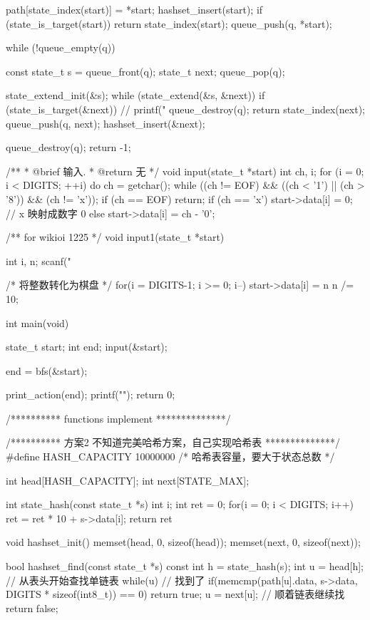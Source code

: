 \begin{Codex}[label=eight_digits_bfs2.c]
{    path[state_index(start)] = *start;
    hashset_insert(start);
    if (state_is_target(start))
        return state_index(start);
    queue_push(q, *start);

    while (!queue_empty(q)) {
        const state_t s = queue_front(q);
        state_t next;
        queue_pop(q);

        state_extend_init(&s);
        while (state_extend(&s, &next)) {
            if (state_is_target(&next)) {
                // printf("%
                queue_destroy(q);
                return state_index(next);
            }
            queue_push(q, next);
            hashset_insert(&next);
        }
    }
    queue_destroy(q);
    return -1;
}

/**
 * @brief 输入.
 * @return 无
 */
void input(state_t *start) {
    int ch, i;
    for (i = 0; i < DIGITS; ++i) {
        do {
            ch = getchar();
        } while ((ch != EOF) && ((ch < '1') || (ch > '8')) && (ch != 'x'));
        if (ch == EOF) return;
        if (ch == 'x') start->data[i] = 0; // x 映射成数字 0
        else           start->data[i] = ch - '0';
    }
}

/** for wikioi 1225 */
void input1(state_t *start) {
    int i, n;
    scanf("%

    /* 将整数转化为棋盘 */
    for(i = DIGITS-1; i >= 0; i--) {
        start->data[i] = n %
        n /= 10;
    }
}

int main(void) {
    state_t start;
    int end;
    input(&start);

    end = bfs(&start);

    print_action(end);
    printf("\n");
    return 0;
}

/********** functions implement **************/

/********** 方案2 不知道完美哈希方案，自己实现哈希表 **************/
#define HASH_CAPACITY  10000000  /* 哈希表容量，要大于状态总数 */

int head[HASH_CAPACITY];
int next[STATE_MAX];

int state_hash(const state_t *s) {
    int i;
    int ret = 0;
    for(i = 0; i < DIGITS; i++) ret = ret * 10 + s->data[i];
    return ret %
}

void hashset_init() {
    memset(head, 0, sizeof(head));
    memset(next, 0, sizeof(next));
}

bool hashset_find(const state_t *s) {
    const int h = state_hash(s);
    int u = head[h]; // 从表头开始查找单链表
    while(u) {
        // 找到了
        if(memcmp(path[u].data, s->data,
                DIGITS * sizeof(int8_t)) == 0) return true;
        u = next[u]; // 顺着链表继续找
    }
    return false;
}


\end{Codex}
